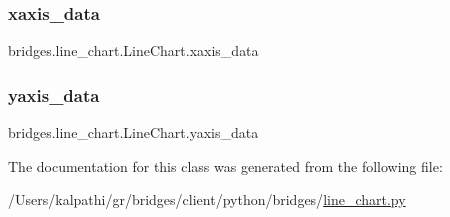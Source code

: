 \subsubsection{\texorpdfstring{xaxis\+\_\+data}{xaxis\_data}}
{\footnotesize\ttfamily bridges.\+line\+\_\+chart.\+Line\+Chart.\+xaxis\+\_\+data}

\mbox{\label{classbridges_1_1line__chart_1_1_line_chart_ae32afdcdfe6398ef247f9431de603495}} 
\subsubsection{\texorpdfstring{yaxis\+\_\+data}{yaxis\_data}}
{\footnotesize\ttfamily bridges.\+line\+\_\+chart.\+Line\+Chart.\+yaxis\+\_\+data}



The documentation for this class was generated from the following file\+:\begin{DoxyCompactItemize}
\item 
/\+Users/kalpathi/gr/bridges/client/python/bridges/\mbox{\hyperlink{line__chart_8py}{line\+\_\+chart.\+py}}\end{DoxyCompactItemize}
